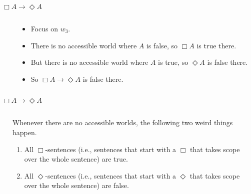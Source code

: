 \documentclass[
  14pt,
  letterpaper,
  ignorenonframetext,
  aspectratio=169,
]{beamer}
\begin{document}
\begin{frame}{\(\Box A \rightarrow \Diamond A\)}
\protect\hypertarget{box-a-rightarrow-diamond-a}{}
\begin{columns}
    \begin{column}{0.45\textwidth}
    \end{column}
    \begin{column}{0.5\textwidth}
    \begin{itemize}
    \item Focus on $w_3$.
    \item There is no accessible world where $A$ is false, so $\Box A$ is true there.
    \item But there is no accessible world where $A$ is true, so $\Diamond A$ is false there.
    \item So $\Box A \rightarrow \Diamond A$ is false there.
    \end{itemize}
\end{column}
\end{columns}
\end{frame}

\begin{frame}{\(\Box A \rightarrow \Diamond A\)}
\protect\hypertarget{box-a-rightarrow-diamond-a-1}{}
\begin{columns}
    \begin{column}{0.45\textwidth}
    \end{column}
    \begin{column}{0.5\textwidth}
    Whenever there are no accessible worlds, the following two weird things happen.
    \begin{enumerate}
    \item All $\Box$-sentences (i.e., sentences that start with a $\Box$ that takes scope over the whole sentence) are true.
    \item All $\Diamond$-sentences (i.e., sentences that start with a $\Diamond$ that takes scope over the whole sentence) are false.
    \end{enumerate}
   \end{column}
\end{columns}
\end{frame}
\end{document}
